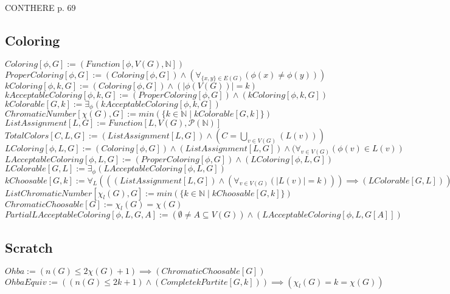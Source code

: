 \documentclass{book}
\newcommand{\abr}{:=}
\newcommand{\st}{\mathbin{|}}
\newcommand{\utup}[1]{\{#1\}}
\begin{document}
CONTHERE p. 69 


\subsection{Coloring}
$Coloring[\phi, G] \abr (Function[\phi, V(G), \mathbb{N}])$ \\
$ProperColoring[\phi, G] \abr (Coloring[\phi, G]) \land (\forall_{\utup{x, y} \in E(G)}(\phi(x) \neq \phi(y)))$ \\
$kColoring[\phi, k, G] \abr (Coloring[\phi, G]) \land (|\phi(V(G))| =  k)$ \\
$kAcceptableColoring[\phi, k, G] \abr (ProperColoring[\phi, G]) \land (kColoring[\phi, k, G])$ \\
$kColorable[G, k] \abr \exists_{\phi}(kAcceptableColoring[\phi, k, G])$ \\
$ChromaticNumber[\chi(G), G] \abr min(\{k \in \mathbb{N} \st kColorable[G, k]\})$ \\

$ListAssignment[L, G] \abr Function[L, V(G), \mathcal{P}(\mathbb{N})]$ \\
$TotalColors[C, L, G] \abr (ListAssignment[L, G]) \land (C = \bigcup \limits_{v \in V(G)}^{}(L(v)))$ \\
$LColoring[\phi, L, G] \abr (Coloring[\phi, G]) \land (ListAssignment[L, G]) \land (\forall_{v \in V(G)}(\phi(v) \in L(v))$ \\
$LAcceptableColoring[\phi, L, G] \abr (ProperColoring[\phi, G]) \land (LColoring[\phi, L, G])$ \\
$LColorable[G, L] \abr \exists_{\phi}(LAcceptableColoring[\phi, L, G])$ \\
$kChoosable[G, k] \abr \forall_{L}(((ListAssignment[L, G]) \land (\forall_{v \in V(G)}(|L(v)| = k))) \implies (LColorable[G, L]))$ \\
$ListChromaticNumber[\chi_l(G), G] \abr min(\{k \in \mathbb{N} \st kChoosable[G, k]\})$ \\

$ChromaticChoosable[G] \abr \chi_l(G) = \chi(G)$ \\
$PartialLAcceptableColoring[\phi, L, G, A] \abr (\emptyset \neq A \subseteq V(G)) \land (LAcceptableColoring[\phi, L, G[A]])$

\subsection{Scratch}
$Ohba \abr (n(G) \leq 2 \chi(G) + 1) \implies (ChromaticChoosable[G])$ \\
$OhbaEquiv \abr ((n(G) \leq 2 k + 1) \land (CompletekPartite[G, k])) \implies (\chi_l(G) = k = \chi(G))$ \\
\end{document}
